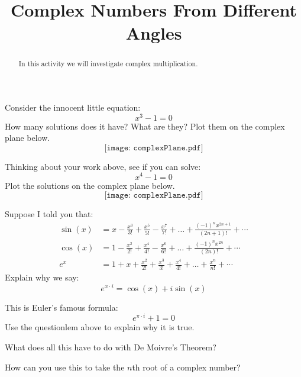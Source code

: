 \documentclass{ximera}
\title{Complex Numbers From Different Angles}
\begin{document}
\begin{abstract}
In this activity we will investigate complex multiplication.
\end{abstract}
\maketitle




\begin{question} Consider the innocent little equation:
\[
x^3 -1 = 0
\]
How many solutions does it have? What are they? Plot them on the
complex plane below.
\[
\texttt{[image: complexPlane.pdf]}
\]
\end{question}

\begin{question}
Thinking about your work above, see if you can solve:
\[
x^4 -1 = 0
\]
Plot the solutions on the complex plane below.
\[
\texttt{[image: complexPlane.pdf]}
\]
\end{question}


\begin{question}
Suppose I told you that:
\begin{align*}
\sin(x) &= x - \frac{x^3}{3!} + \frac{x^5}{5!} - \frac{x^7}{7!} + \dots + \frac{(-1)^n x^{2n+1}}{(2n+1)!} + \cdots \\
\cos(x) &= 1 - \frac{x^2}{2!} + \frac{x^4}{4!} - \frac{x^6}{6!} + \dots + \frac{(-1)^n x^{2n}}{(2n)!} + \cdots \\
e^x &= 1 + x + \frac{x^2}{2!} + \frac{x^3}{3!} + \frac{x^4}{4!} + \dots + \frac{x^n}{n!} + \cdots 
\end{align*}
Explain why we say:
\[
e^{x\cdot i} = \cos(x) + i \sin(x)
\]
\end{question}

\begin{question}
 This is Euler's famous formula:
\[
e^{\pi \cdot i } + 1 = 0
\]
Use the questionlem above to explain why it is true.
\end{question}

\begin{question}
What does all this have to do with De Moivre's Theorem?
\end{question}

\begin{question}
How can you use this to take the $n$th root of a complex number?
\end{question}
\end{document}
